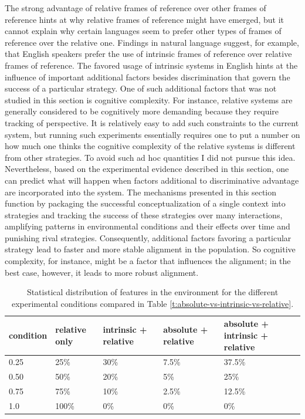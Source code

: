 The strong advantage of relative frames of reference over other frames of reference 
hints at why relative frames of reference might have emerged, but it cannot explain why 
certain languages seem to prefer other types of frames of reference over the relative one.
Findings in natural language suggest, for example, that English speakers 
prefer the use of intrinsic frames of reference over relative frames of reference. 
The favored usage of intrinsic systems in English hints at the influence of  
important additional factors besides discrimination that govern the success of a particular strategy. One of such additional factors that was not studied in 
this section is cognitive complexity. For instance, 
relative systems are generally considered to be cognitively more 
demanding because they require tracking of perspective. It is relatively 
easy to add such constraints to the current
system, but running such experiments essentially requires one to 
put a number on how much one thinks the cognitive complexity of the 
relative systems is different from other strategies. To avoid such ad hoc 
quantities I did not pursue this idea. Nevertheless, based
on the experimental evidence described in this section, one can predict 
what will happen when factors additional to discriminative advantage 
are incorporated into the system. The mechanisms presented in 
this section function by packaging the successful 
conceptualization of a single context into strategies and tracking the success of
these strategies over many interactions, amplifying patterns in environmental conditions
and their effects over time and punishing rival strategies. Consequently, additional factors
favoring a particular strategy lead to faster and more stable alignment in the population.
So cognitive complexity, for instance, might be a factor that influences the alignment; 
in the best case, however, it leads to more robust alignment.


\begin{table}
\caption[Statistical distribution of features in the environment]{
Statistical distribution of features in the environment for
the different experimental conditions compared in Table \ref{t:absolute-vs-intrinsic-vs-relative}.}
\begin{center}
\begin{tabular}{ | l | p{1.5cm} | p{1.5cm} | p{1.5cm} | p{1.5cm} |}
\hline
condition & relative only & intrinsic + relative & absolute + relative & absolute + intrinsic + relative \\ \hline\hline
0.25 & 25\% & 30\% & 7.5\% & 37.5\%\\ \hline
0.50 & 50\% & 20\% & 5\% & 25\% \\ \hline
0.75 & 75\% & 10\% & 2.5\% & 12.5\% \\ \hline
1.0 & 100\% & 0\% & 0\% & 0\%\\ \hline
\end{tabular}
\end{center}
\label{t:experimental-conditions-absolute-vs-intrinsic-vs-relative}
\end{table}


